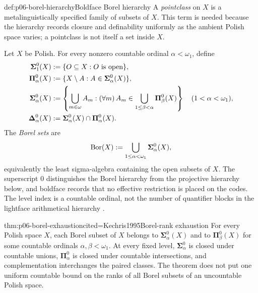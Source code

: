 \begin{hbdefinition}{def:p06-borel-hierarchy}{Boldface Borel hierarchy}
A \emph{pointclass} on \(X\) is a metalinguistically specified family of
subsets of \(X\).  This term is needed because the hierarchy records closure
and definability uniformly as the ambient Polish space varies; a pointclass is
not itself a set inside \(X\).

Let \(X\) be Polish.  For every nonzero countable ordinal
\(\alpha<\omega_1\), define
\[
\begin{aligned}
  \boldsymbol{\Sigma}^{0}_{1}(X)
    &\mathrel{:=} \{O\subseteq X:O\text{ is open}\},\\
  \boldsymbol{\Pi}^{0}_{\alpha}(X)
    &\mathrel{:=} \{X\setminus A:A\in
       \boldsymbol{\Sigma}^{0}_{\alpha}(X)\},\\
  \boldsymbol{\Sigma}^{0}_{\alpha}(X)
    &\mathrel{:=}
      \left\{\bigcup_{m\in\omega}A_m:
      (\forall m)\,
      A_m\in
      \bigcup_{1\leq\beta<\alpha}
      \boldsymbol{\Pi}^{0}_{\beta}(X)\right\}
      \quad(1<\alpha<\omega_1),\\
  \boldsymbol{\Delta}^{0}_{\alpha}(X)
    &\mathrel{:=}
      \boldsymbol{\Sigma}^{0}_{\alpha}(X)
      \cap\boldsymbol{\Pi}^{0}_{\alpha}(X).
\end{aligned}
\]
The \emph{Borel sets} are
\[
  \operatorname{Bor}(X)
  \mathrel{:=} \bigcup_{1\leq\alpha<\omega_1}
  \boldsymbol{\Sigma}^{0}_{\alpha}(X),
\]
equivalently the least sigma-algebra containing the open subsets of \(X\).
The superscript \(0\) distinguishes the Borel hierarchy from the projective
hierarchy below, and boldface records that no effective restriction is placed
on the codes.  The level index is a countable ordinal, not the number of
quantifier blocks in the lightface arithmetical hierarchy
\cite[Sections~11--13]{Kechris1995}.
\end{hbdefinition}

\begin{hbtheorem}{thm:p06-borel-exhaustion}{cited=Kechris1995}{Borel-rank exhaustion}
For every Polish space \(X\), each Borel subset of \(X\) belongs to
\(\boldsymbol{\Sigma}^{0}_{\alpha}(X)\) and to
\(\boldsymbol{\Pi}^{0}_{\beta}(X)\) for some countable ordinals
\(\alpha,\beta<\omega_1\).  At every fixed level,
\(\boldsymbol{\Sigma}^{0}_{\alpha}\) is closed under countable unions,
\(\boldsymbol{\Pi}^{0}_{\alpha}\) is closed under countable intersections,
and complementation interchanges the paired classes.  The theorem does not
put one uniform countable bound on the ranks of all Borel subsets of an
uncountable Polish space.
\end{hbtheorem}

